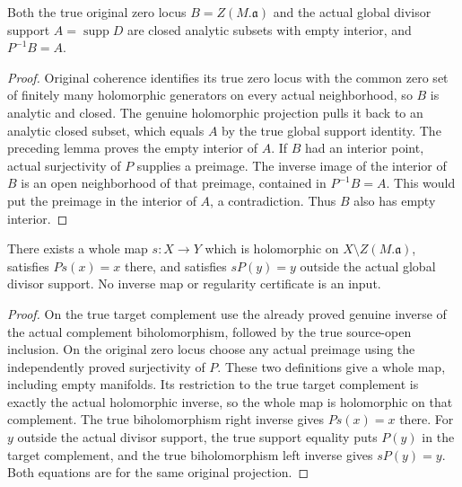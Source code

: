 \begin{theorem}
\label{hir:original-global-principalization-true-thin-analytic-loci}
\leanok
{}
Both the true original zero locus $B=Z(M.\mathfrak a)$ and the actual
global divisor support $A=\operatorname{supp}D$ are closed analytic
subsets with empty interior, and $P^{-1}B=A$.
\end{theorem}
\begin{proof}
Original coherence identifies its true zero locus with the common zero
set of finitely many holomorphic generators on every actual neighborhood,
so $B$ is analytic and closed.  The genuine holomorphic projection pulls
it back to an analytic closed subset, which equals $A$ by the true global
support identity.  The preceding lemma proves the empty interior of $A$.
If $B$ had an interior point, actual surjectivity of $P$ supplies a
preimage.  The inverse image of the interior of $B$ is an open
neighborhood of that preimage, contained in $P^{-1}B=A$.  This would put
the preimage in the interior of $A$, a contradiction.  Thus $B$ also
has empty interior.
\end{proof}

\begin{theorem}
\label{hir:original-global-terminal-whole-off-zero-inverse-section}
\leanok
{}
There exists a whole map $s:X\to Y$ which is holomorphic on
$X\setminus Z(M.\mathfrak a)$, satisfies $Ps(x)=x$ there, and satisfies
$sP(y)=y$ outside the actual global divisor support.  No inverse map or
regularity certificate is an input.
\end{theorem}
\begin{proof}
On the true target complement use the already proved genuine inverse
of the actual complement biholomorphism, followed by the true source-open
inclusion.  On the original zero locus choose any actual preimage using
the independently proved surjectivity of $P$.  These two definitions
give a whole map, including empty manifolds.  Its restriction to the
true target complement is exactly the actual holomorphic inverse, so
the whole map is holomorphic on that complement.  The true
biholomorphism right inverse gives $Ps(x)=x$ there.  For $y$ outside the
actual divisor support, the true support equality puts $P(y)$ in the
target complement, and the true biholomorphism left inverse gives
$sP(y)=y$.  Both equations are for the same original projection.
\end{proof}


